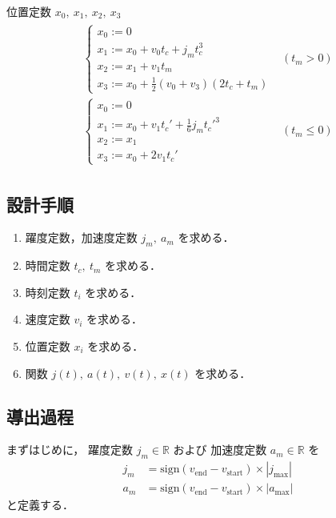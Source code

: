\documentclass[a5paper]{ltjsarticle}
\begin{document}
位置定数 $x_0,~x_1,~x_2,~x_3$
\begin{align}
    \begin{array}{ll}
        \left\{ \begin{array}{l}
            x_0 := 0                         \\
            x_1 := x_0 + v_0 t_c + j_m t_c^3 \\
            x_2 := x_1 + v_1 t_m             \\
            x_3 := x_0 + \frac{1}{2} (v_0+v_3) (2t_c+t_m)
        \end{array} \right.
         &
        (t_m > 0)
        \\
        \left\{ \begin{array}{l}
            x_0 := 0                                       \\
            x_1 := x_0 + v_1 t_c' + \frac{1}{6} j_m t_c'^3 \\
            x_2 := x_1                                     \\
            x_3 := x_0 + 2 v_1 t_c'
        \end{array} \right.
         &
        (t_m \leq 0)
    \end{array}
\end{align}

\subsection{設計手順}
\begin{enumerate}
    \item 躍度定数，加速度定数 $j_m,~a_m$ を求める．
    \item 時間定数 $t_c,~t_m$ を求める．
    \item 時刻定数 $t_i$ を求める．
    \item 速度定数 $v_i$ を求める．
    \item 位置定数 $x_i$ を求める．
    \item 関数 $j(t),~ a(t),~ v(t),~ x(t)$ を求める．
\end{enumerate}

\subsection{導出過程}
まずはじめに，
躍度定数 $j_m \in \mathbb{R}$ および 加速度定数 $a_m \in \mathbb{R}$ を
\begin{align}
    j_m & = \mathrm{sign}(v_\mathrm{end}-v_\mathrm{start}) \times|j_{\max}| \\
    a_m & = \mathrm{sign}(v_\mathrm{end}-v_\mathrm{start}) \times|a_{\max}|
\end{align}
と定義する．
\end{document}

